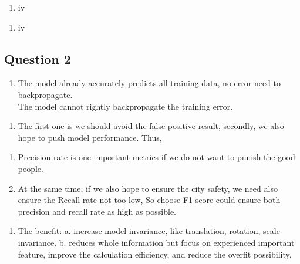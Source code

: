 \documentclass[11pt]{article}
\providecommand{\tightlist}{%
      \setlength{\itemsep}{0pt}\setlength{\parskip}{0pt}}
\begin{document}
    \begin{enumerate}
\def\labelenumi{(\alph{enumi})}
\setcounter{enumi}{6}
\tightlist
\item
  iv
\end{enumerate}

    \begin{enumerate}
\def\labelenumi{(\alph{enumi})}
\setcounter{enumi}{7}
\tightlist
\item
  iv
\end{enumerate}

    \hypertarget{question-2}{%
\subsection{Question 2}\label{question-2}}

    \begin{enumerate}
\def\labelenumi{(\alph{enumi})}
\tightlist
\item
  The model already accurately predicts all training data, no error need
  to backpropagate.\\
  The model cannot rightly backpropagate the training error.
\end{enumerate}

    \begin{enumerate}
\def\labelenumi{(\alph{enumi})}
\setcounter{enumi}{1}
\tightlist
\item
  The first one is we should avoid the false positive result, secondly,
  we also hope to push model performance. Thus,
\end{enumerate}

\begin{enumerate}
\def\labelenumi{\arabic{enumi}.}
\tightlist
\item
  Precision rate is one important metrics if we do not want to punish
  the good people.
\item
  At the same time, if we also hope to ensure the city safety, we need
  also ensure the Recall rate not too low, So choose F1 score could
  ensure both precision and recall rate as high as possible.
\end{enumerate}

    \begin{enumerate}
\def\labelenumi{(\alph{enumi})}
\setcounter{enumi}{2}
\tightlist
\item
  The benefit: a. increase model invariance, like translation, rotation,
  scale invariance. b. reduces whole information but focus on
  experienced important feature, improve the calculation efficiency, and
  reduce the overfit possibility.
\end{enumerate}
\end{document}
